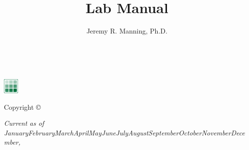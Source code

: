 \documentclass{tufte-book} %
\title{Lab Manual} %
\author{Jeremy R. Manning, Ph.D.} %
\newcommand{\monthyear}{\ifcase\month\or January\or February\or March\or April\or May\or June\or July\or August\or September\or October\or November\or December\fi,\space\number\year} %
\newcommand{\openepigraph}[2]{ %
\begin{fullwidth}
\sffamily%
\begin{doublespace}
\noindent\allcaps{#1}\\ %
\noindent\allcaps{#2} %
\end{doublespace}
\end{fullwidth}
}
\begin{document}
\frontmatter


\thispagestyle{empty}


\maketitle %

\newpage
\begin{fullwidth}
~\vfill
\thispagestyle{empty}
\setlength{\parindent}{0pt}
\setlength{\parskip}{\baselineskip}

\includegraphics[width=0.3in,left]{./lab_logo/CDL_Avatar_Cropped.png}\\\vspace{0.2in}

Copyright \copyright\ \the\year\ \thanklessauthor

\par{}

\par{}


\par\textit{Current as of \monthyear}
\end{fullwidth}


\setcounter{tocdepth}{1}
\tableofcontents %

\end{document}
